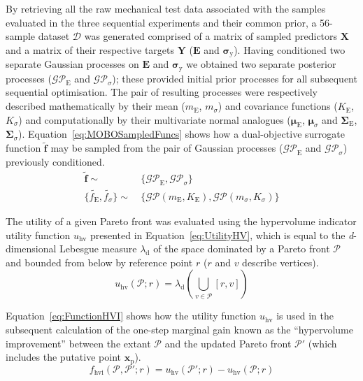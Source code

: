 By retrieving all the raw mechanical test data associated with the samples
 evaluated in the three sequential experiments and their common prior, a
 56-sample dataset \(\mathcal{D}\) was generated comprised of a matrix of
 sampled predictors \(\mathbf{X}\) and a matrix of their respective
 targets \(\mathbf{Y}\) (\(\mathbf{E}\) and \(\bm{\sigma_{\mathrm{y}}}\)).
Having conditioned two separate Gaussian processes on \(\mathbf{E}\) and
 \(\bm{\sigma_{\mathrm{y}}}\) we obtained two separate posterior processes
 (\(\mathcal{GP}_{\mathrm{E}}\) and \(\mathcal{GP}_{\sigma}\)); these
 provided initial prior processes for all subsequent sequential optimisation.
The pair of resulting processes were respectively described mathematically
 by their mean (\(m_{\mathrm{E}}\), \(m_{\sigma}\)) and covariance functions
 (\(K_{\mathrm{E}}\), \(K_{\sigma}\)) and computationally by their multivariate
 normal analogues (\(\bm{\mu}_{\mathrm{E}}\), \(\bm{\mu}_{\sigma}\) and
 \(\bm{\Sigma}_{\mathrm{E}}\), \(\bm{\Sigma}_{\sigma}\)).
Equation~\ref{eq:MOBOSampledFuncs} shows how a dual-objective surrogate
 function \(\tilde{\mathbf{f}}\) may be sampled from the pair of Gaussian
 processes (\(\mathcal{GP}_{\mathrm{E}}\) and \(\mathcal{GP}_{\sigma}\)) previously
 conditioned.
\footnotesize
\begin{equation}\label{eq:MOBOSampledFuncs}
    \begin{split}
    \tilde{\mathbf{f}}\sim\:&\{\mathcal{GP}_{\mathrm{E}},\mathcal{GP}_{\sigma}\}\\
    \{\tilde{f_{\mathrm{E}}},\tilde{f_{\sigma}}\}\sim\:&\{\mathcal{GP}(m_{\mathrm{E}},K_{\mathrm{E}}),\mathcal{GP}(m_{\sigma},K_{\sigma})\}
    \end{split}
\end{equation}
\normalsize

The utility of a given Pareto front was evaluated using the hypervolume indicator
 utility function \(u_{\mathrm{hv}}\) presented in Equation~\ref{eq:UtilityHV}, which
 is equal to the \textit{d}-dimensional Lebesgue measure \(\lambda_{\mathrm{d}}\) of the space
 dominated by a Pareto front \(\mathcal{P}\) and bounded from below by
 reference point \(r\) (\(r\) and \(v\) describe vertices).
\begin{equation}\label{eq:UtilityHV}
    u_{\mathrm{hv}}(\mathcal{P};r)=\lambda_{\mathrm{d}}(\bigcup_{v \in \mathcal{P}}[r,v])
\end{equation}

Equation~\ref{eq:FunctionHVI} shows how the utility function \(u_{\mathrm{hv}}\) is
 used in the subsequent calculation of the one-step marginal gain known as
 the ``hypervolume improvement'' between the extant \(\mathcal{P}\) and the
 updated Pareto front \(\mathcal{P}'\) (which includes the putative point
 \(\mathbf{x}_{\mathrm{p}}\)).
\begin{equation}\label{eq:FunctionHVI}
    f_{\mathrm{hvi}}(\mathcal{P},\mathcal{P}';r)=u_{\mathrm{hv}}(\mathcal{P}';r)-u_{\mathrm{hv}}(\mathcal{P};r)
\end{equation}

